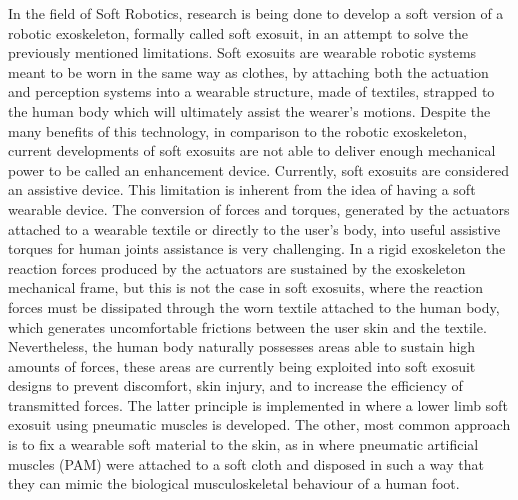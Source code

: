 In the field of Soft Robotics, research is being done to develop a soft version of a robotic exoskeleton, formally called soft exosuit, in an attempt to solve the previously mentioned limitations. Soft exosuits are wearable robotic systems meant to be worn in the same way as clothes, by attaching both the actuation and perception systems into a wearable structure, made of textiles, strapped to the human body which will ultimately assist the wearer's motions. Despite the many benefits of this technology, in comparison to the robotic exoskeleton, current developments of soft exosuits are not able to deliver enough mechanical power to be called an enhancement device. Currently, soft exosuits are considered an assistive device. This limitation is inherent from the idea of having a soft wearable device. The conversion of forces and torques, generated by the actuators attached to a wearable textile or directly to the user's body, into useful assistive torques for human joints assistance is very challenging. In a rigid exoskeleton the reaction forces produced by the actuators are sustained by the exoskeleton mechanical frame, but this is not the case in soft exosuits, where the reaction forces must be dissipated through the worn textile attached to the human body, which generates uncomfortable frictions between the user skin and the textile. Nevertheless, the human body naturally possesses areas able to sustain high amounts of forces, these areas are currently being exploited into soft exosuit designs to prevent discomfort, skin injury, and to increase the efficiency of transmitted forces. The latter principle is implemented in \cite{wehner2013lightweight} where a lower limb soft exosuit using pneumatic muscles is developed. The other, most common approach is to fix a wearable soft material to the skin, as in \cite{park2014design,park2011bio} where pneumatic artificial muscles (PAM) were attached to a soft cloth and disposed in such a way that they can mimic the biological musculoskeletal behaviour of a human foot.

